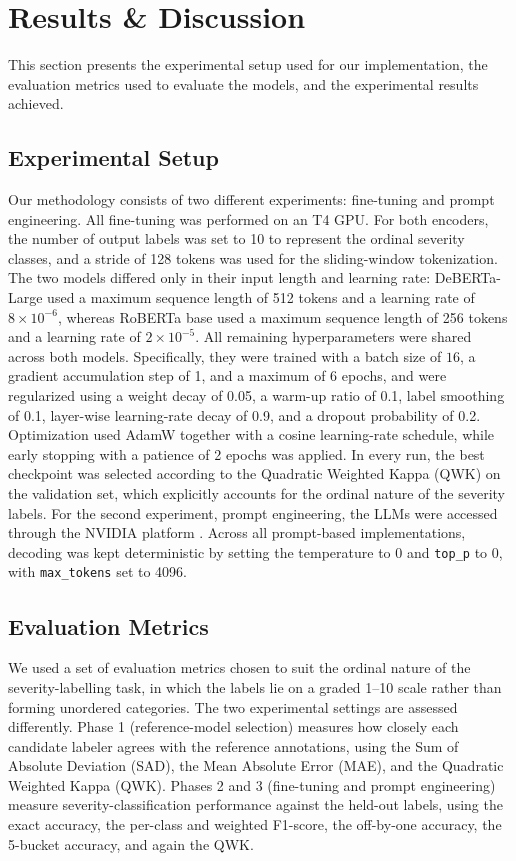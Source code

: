 \documentclass[conference]{IEEEtran}
\begin{document}
\section{Results \& Discussion}
This section presents the experimental setup used for our implementation, the evaluation metrics used to evaluate the models, and the experimental results achieved.

\subsection{Experimental Setup}
Our methodology consists of two different experiments: fine-tuning and prompt
engineering. All fine-tuning was performed on an T4 GPU. For both encoders, the number of output labels was set to 10 to represent the ordinal severity classes, and a stride of 128 tokens was used for the sliding-window tokenization. The two models differed only in their input length and learning rate: DeBERTa-Large used a maximum sequence length of 512 tokens and a learning rate of $8\times10^{-6}$, whereas RoBERTa base used a maximum sequence length of 256 tokens and a learning rate of $2\times10^{-5}$. All remaining hyperparameters were shared across both models. Specifically, they were trained with a batch size of $16$, a gradient accumulation step of 1, and a maximum of 6 epochs, and were regularized using a weight decay of 0.05, a warm-up ratio of 0.1, label smoothing of 0.1, layer-wise learning-rate decay of 0.9, and a dropout probability of 0.2. Optimization used AdamW together with a cosine learning-rate schedule, while early stopping with a patience of 2 epochs was applied. In every run, the best checkpoint was selected according to the Quadratic Weighted Kappa (QWK) on the validation set, which explicitly accounts for the ordinal nature of the severity labels.
For the second experiment, prompt engineering, the LLMs were accessed through the NVIDIA platform \cite{nvidia_build_2026}. Across all prompt-based implementations, decoding was kept deterministic by setting the temperature to 0 and \texttt{top\_p} to 0, with \texttt{max\_tokens} set to 4096.

\subsection{Evaluation Metrics}
We used a set of evaluation metrics chosen to suit the ordinal nature of the severity-labelling task, in which the labels lie on a graded 1--10 scale rather than forming unordered categories. The two experimental settings are assessed differently. Phase 1 (reference-model selection) measures how closely each candidate labeler agrees with the reference annotations, using the Sum of Absolute Deviation (SAD), the Mean Absolute Error (MAE), and the Quadratic Weighted Kappa (QWK). Phases 2 and 3 (fine-tuning and prompt engineering) measure severity-classification performance against the held-out labels, using the exact accuracy, the per-class and weighted F1-score, the off-by-one accuracy, the 5-bucket accuracy, and again the QWK.
\end{document}
